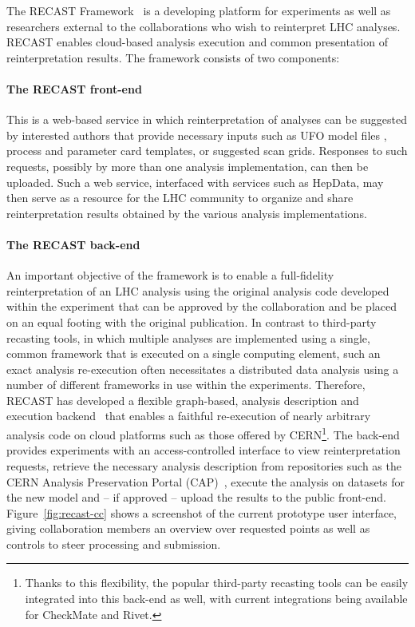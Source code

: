 The RECAST Framework~\cite{Cranmer2011} is a developing platform for experiments as well as  researchers external to the collaborations who wish to reinterpret LHC analyses. RECAST enables cloud-based analysis execution and common presentation of reinterpretation results. The framework consists of two components:

\paragraph{The RECAST front-end} This is a web-based service in which reinterpretation of analyses can be suggested by interested authors that provide necessary inputs such as UFO model files \cite{Degrande:2011ua}, process and parameter card templates, or suggested scan grids. Responses to such requests, possibly by more than one analysis implementation, can then be uploaded. Such a web service, interfaced with services such as HepData, may then serve as a resource for the LHC community to organize and share reinterpretation results obtained by the various analysis implementations.

\paragraph{The RECAST back-end} An important objective of the framework is to enable a full-fidelity reinterpretation of an LHC analysis using the original analysis code developed within the experiment that can be approved by the collaboration and be placed on an equal footing with the original publication. In contrast to third-party recasting tools, in which multiple analyses are implemented using a single, common framework that is  executed on a single computing element, such an exact analysis re-execution often necessitates a distributed data analysis using a number of different frameworks in use within the experiments. Therefore, RECAST has developed a flexible graph-based, analysis description and execution backend~\cite{Heinrich:2297545} that enables a faithful re-execution of nearly arbitrary analysis code on cloud platforms such as those offered by CERN\footnote{Thanks to this flexibility, the popular third-party recasting tools can  be easily integrated into this back-end as well, with current integrations being available for CheckMate and Rivet.}. The back-end provides experiments with an access-controlled interface to view reinterpretation requests, retrieve the necessary analysis description from repositories such as the CERN Analysis Preservation Portal (CAP)~\cite{CAP},  execute the analysis on datasets for the new model and -- if approved -- upload the results to the public front-end. Figure~\ref{fig:recast-cc} shows a screenshot of the current prototype user interface, giving collaboration members an overview over requested points as well as controls to steer processing and submission.

